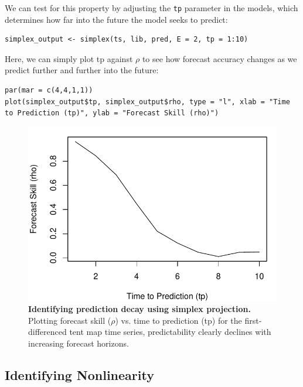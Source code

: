 We can test for this property by adjusting the \lstinline{tp} parameter in the models, which determines how far into the future the model seeks to predict:

\begin{lstlisting}
simplex_output <- simplex(ts, lib, pred, E = 2, tp = 1:10)
\end{lstlisting}

Here, we can simply plot tp against $\rho$ to see how forecast accuracy changes as we predict further and further into the future:

\begin{lstlisting}
par(mar = c(4,4,1,1))
plot(simplex_output$tp, simplex_output$rho, type = "l", xlab = "Time to Prediction (tp)", ylab = "Forecast Skill (rho)")
\end{lstlisting}

\begin{figure}[!ht]
\begin{center}\includegraphics[width=\maxwidth{\textwidth}]{fig_redm_4.pdf}\end{center}
\caption[Identifying prediction decay using simplex projection.]{\textbf{Identifying prediction decay using simplex projection.}\newline
Plotting forecast skill ($\rho$) vs. time to prediction (tp) for the first-differenced tent map time series, predictability clearly declines with increasing forecast horizons.}
\end{figure}

\subsection{Identifying Nonlinearity}


